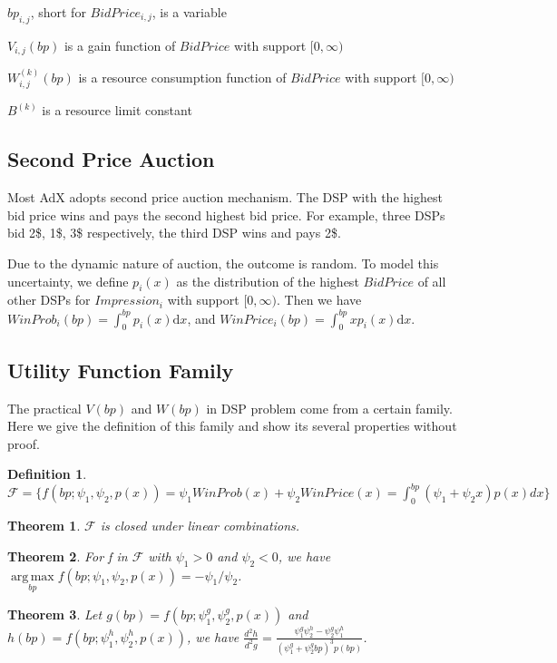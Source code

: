 \documentclass{article}
\newtheorem{theorem}{Theorem}[section]
\theoremstyle{definition}
\newtheorem{definition}{Definition}[section]
\DeclareMathOperator*{\argmax}{arg\,max}
\newcommand{\sbp}{bp_{i,j}}
\newcommand{\sV}{V_{i,j}}
\newcommand{\sW}{W_{i,j}^{(k)}}
\newcommand{\sB}{B^{(k)}}
\newcommand{\pprob}{\psi_1}
\newcommand{\pprice}{\psi_2}
\newcommand{\uff}{\mathscr{F}}
\newcommand{\uf}{f(bp; \pprob, \pprice, p(x))}
\begin{document}
\begin{CJK}{UTF8}{gbsn}
$\sbp$, short for $BidPrice_{i,j}$, is a variable

$\sV(bp)$ is a gain function of $BidPrice$ with support $[0, \infty)$

$\sW(bp)$ is a resource consumption function of $BidPrice$ with support $[0, \infty)$

$\sB$ is a resource limit constant

\subsection{Second Price Auction}

Most AdX adopts second price auction mechanism.
The DSP with the highest bid price wins and pays the second highest bid price.
For example, three DSPs bid 2\$, 1\$, 3\$ respectively, the third DSP wins and pays 2\$. 

Due to the dynamic nature of auction, the outcome is random.
To model this uncertainty, we define $p_i(x)$ as
   the distribution of the highest $BidPrice$ of all other DSPs for $Impression_i$ with support $[0, \infty)$.
Then we have $WinProb_i(bp)=\int_0^{bp} p_i(x) \mathrm{d} x$, and $WinPrice_i(bp)=\int_0^{bp} x p_i(x) \mathrm{d} x$.

\subsection{Utility Function Family}

The practical $V(bp)$ and $W(bp)$ in DSP problem come from a certain family.
Here we give the definition of this family and show its several properties without proof.

\begin{definition}
$\uff = \{ \uf = \pprob WinProb(x) + \pprice WinPrice(x) = \int_0^{bp} (\pprob + \pprice x)p(x)dx \} $
\end{definition}

\begin{theorem}
$\uff$ is closed under linear combinations.
\end{theorem}

\begin{theorem}
For f in $\uff$ with $\pprob > 0$ and $\pprice < 0$, we have $\argmax\limits_{bp} \uf = - \pprob / \pprice$.
\end{theorem}

\begin{theorem}
Let $g(bp)=f(bp;\pprob^g,\pprice^g,p(x))$ and $h(bp)=f(bp;\pprob^h,\pprice^h,p(x))$,
    we have $\frac{d^2h}{d^2g} = \frac{\pprob^g \pprice^h - \pprice^g \pprob^h}{(\pprob^g + \pprice^g bp)^3 p(bp)}$.
\end{theorem}


\end{CJK}
\end{document}
